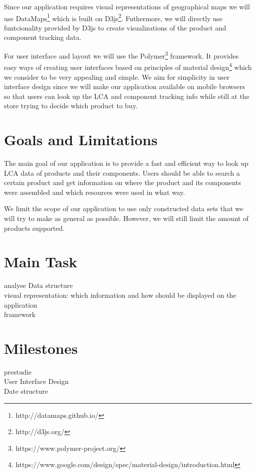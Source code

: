 \documentclass[a4page]{article}
\begin{document}
Since our application requires visual representations of geographical maps we will use DataMaps\footnote{http://datamaps.github.io/} which is built on D3js\footnote{http://d3js.org/}.
Futhermore, we will directly use funtcionality provided by D3js to create visualizations of the product and component tracking data.

For user interface and layout we will use the Polymer\footnote{https://www.polymer-project.org/} framework. 
It provides easy ways of creating user interfaces based on principles of material design\footnote{https://www.google.com/design/spec/material-design/introduction.html} which we consider to be very appealing and simple.
We aim for simplicity in user interface design since we will make our application available on mobile browsers so that users can look up the \ac{LCA} and component tracking info while still at the store trying to decide which product to buy.

\section{Goals and Limitations}
The main goal of our application is to provide a fast and efficient way to look up \ac{LCA} data of products and their components.
Users should be able to search a certain product and get information on where the product and its components were assembled and which resources were used in what way. 

We limit the scope of our application to use only constructed data sets that we will try to make as general as possible.
However, we will still limit the amount of products supported.

\section{Main Task}
 analyse Data structure\\
visual representation: which information and how should be displayed on the application\\
framework\\

\section{Milestones}
prestudie\\
User Interface Design\\
Date structure\\

\newpage
\begin{acronym}
\end{acronym}



\end{document}
